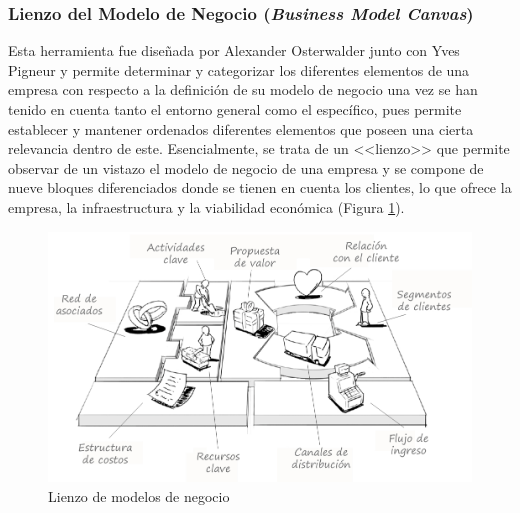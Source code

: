 \subsubsection{Lienzo del Modelo de Negocio (\textit{Business Model Canvas})}
Esta herramienta \cite{cristinaramosvega2018} fue diseñada por Alexander Osterwalder junto con Yves Pigneur y permite determinar y categorizar los diferentes elementos de una empresa con respecto a la definición de su modelo de negocio una vez se han tenido en cuenta tanto el entorno general como el específico, pues permite establecer y mantener ordenados diferentes elementos que poseen una cierta relevancia dentro de este. Esencialmente, se trata de un <<lienzo>> que permite observar de un vistazo el modelo de negocio de una empresa y se compone de nueve bloques diferenciados donde se tienen en cuenta los clientes, lo que ofrece la empresa, la infraestructura y la viabilidad económica (Figura \ref{fig:bmc}).

\begin{figure}[h]
  \centering
  \includegraphics[width=0.8\linewidth]{figures/images/lienzo_modelos.jpg}
  \caption{Lienzo de modelos de negocio}
  \label{fig:bmc}
\end{figure}